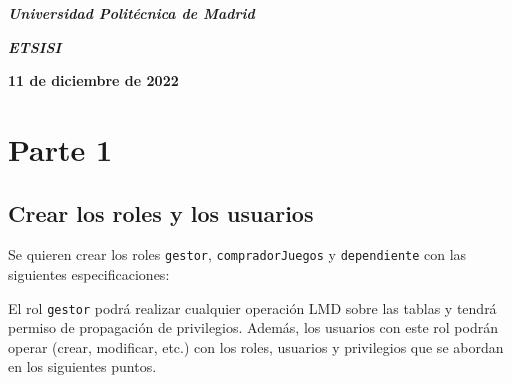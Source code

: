 \documentclass[a4paper, 11pt, oneside]{article} %
\newcommand{\plogo}{\fbox{$\mathcal{LCDPM}$}} %
\begin{document}
\begin{titlepage}
	\vspace{1.0\baselineskip} %
	
	\textit{\textbf{Universidad Politécnica de Madrid \\}} %

	\vspace{0.25\baselineskip} %

	\textit{\textbf{ETSISI}} %
	
	\vfill %
	
	
	\textbf{11 de diciembre de 2022} %
	
	\vspace{0.5\baselineskip} %

	\plogo %

\end{titlepage}


\renewcommand*\contentsname{Índice} %

\setcounter{tocdepth}{3} %

\tableofcontents %

\newpage

	
\section{Parte 1}

\subsection{Crear los roles y los usuarios}

Se quieren crear los roles \texttt{gestor}, \texttt{compradorJuegos} y \texttt{dependiente} con las siguientes especificaciones:

El rol \texttt{gestor} podrá realizar cualquier operación LMD sobre las tablas y tendrá permiso de propagación de privilegios. Además, los usuarios con este rol podrán operar (crear, modificar, etc.) con los roles, usuarios y privilegios que se abordan en los siguientes puntos.
\end{document}

